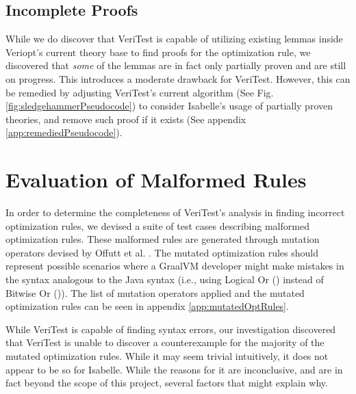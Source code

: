 \subsection{Incomplete Proofs}

While we do discover that VeriTest is capable of utilizing existing lemmas inside Veriopt's current theory base to find proofs for the 
optimization rule, we discovered that \emph{some} of the lemmas are in fact only partially proven and are still on progress. 
This introduces a moderate drawback for VeriTest. However, this can be remedied by adjusting VeriTest's current algorithm 
(See Fig. \ref{fig:sledgehammerPseudocode}) to consider Isabelle's usage of partially proven theories, and remove such proof if it 
exists (See appendix \ref{app:remediedPseudocode}).






\section{Evaluation of Malformed Rules}

In order to determine the completeness of VeriTest's analysis in finding incorrect optimization rules, we devised a suite of test cases describing 
malformed optimization rules. These malformed rules are generated through mutation operators devised by Offutt et al. \cite{offutt_mutation_2006}.
The mutated optimization rules should represent possible scenarios where a GraalVM developer might make mistakes in the syntax analogous to 
the Java syntax (i.e., using Logical Or (\mono{||}) instead of Bitwise Or (\mono{|})). The list of mutation operators applied and the mutated 
optimization rules can be seen in appendix \ref{app:mutatedOptRules}.



While VeriTest is capable of finding syntax errors, our investigation discovered that VeriTest is unable to discover a counterexample for 
the majority of the mutated optimization rules. While it may seem trivial intuitively, it does not appear to be so for Isabelle. While the 
reasons for it are inconclusive, and are in fact beyond the scope of this project, several factors that might explain why.

